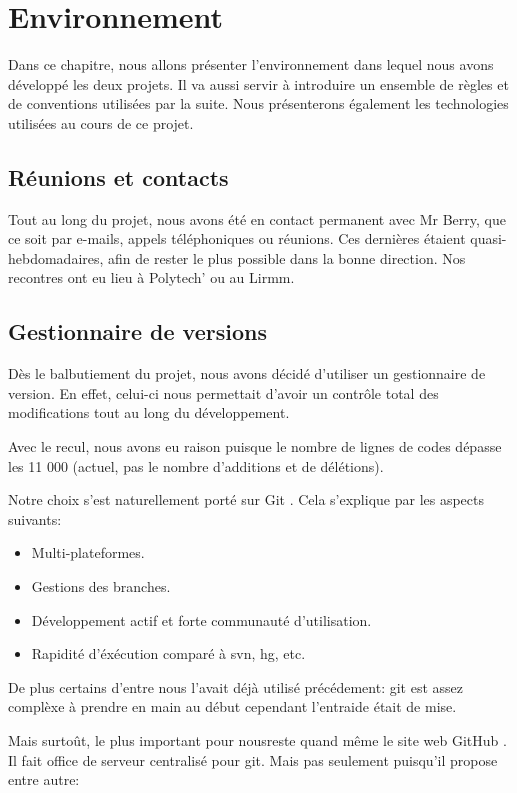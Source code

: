 \chapter{Environnement}

Dans ce chapitre, nous allons présenter l'environnement dans lequel nous avons
développé les deux projets. Il va aussi servir à introduire un ensemble de
règles et de conventions utilisées par la suite.
Nous présenterons également les technologies utilisées au cours de ce projet.

    \section{Réunions et contacts}
Tout au long du projet, nous avons été en contact permanent avec Mr Berry,
que ce soit par e-mails, appels téléphoniques ou réunions. Ces dernières
étaient quasi-hebdomadaires, afin de rester le plus possible dans la
bonne direction. Nos recontres ont eu lieu à Polytech' ou au Lirmm.

    \section{Gestionnaire de versions}
Dès le balbutiement du projet, nous avons décidé d'utiliser un gestionnaire
de version. En effet, celui-ci nous permettait d'avoir un contrôle total des modifications
tout au long du développement.

Avec le recul, nous avons eu raison puisque le nombre de lignes de codes dépasse 
les 11 000 (actuel, pas le nombre d'additions et de délétions).

Notre choix s'est naturellement porté sur Git \cite{git}. Cela s'explique 
par les aspects suivants:

    \begin{itemize}
    \item Multi-plateformes.
    \item Gestions des branches.
    \item Développement actif et forte communauté d'utilisation.
    \item Rapidité d'éxécution comparé à svn, hg, etc. 
    \end{itemize}

    De plus certains d'entre nous l'avait déjà utilisé précédement: git est assez
    complèxe à prendre en main au début cependant l'entraide était de mise.

    Mais surtoût, le plus important pour nousreste quand même le site web GitHub \cite{github}.
    Il fait office de serveur centralisé pour git. Mais pas seulement puisqu'il 
    propose entre autre:


